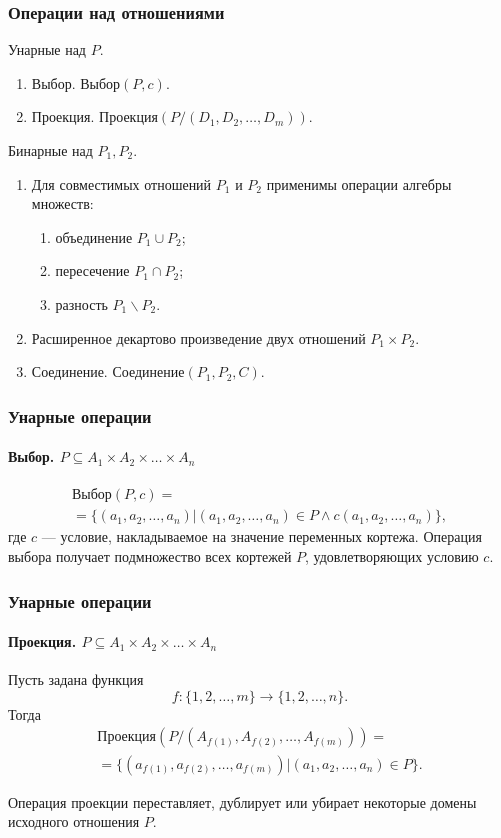 \begin{frame}
    \frametitle{Операции над отношениями}
    
    Унарные над $P$.
    \begin{enumerate}
        \item \alert{Выбор}. $\textit{Выбор}(P,c)$.
        \item \alert{Проекция}. $\textit{Проекция}(P/(D_1,D_2,\ldots,D_m))$.
    \end{enumerate}
    
    Бинарные над $P_1,P_2$.
    \begin{enumerate}
        \item Для \alert{совместимых} отношений $P_1$ и $P_2$ применимы операции алгебры множеств:
        \begin{enumerate}
            \item \alert{объединение} $P_1\cup P_2$;
            \item \alert{пересечение} $P_1\cap P_2$;
            \item \alert{разность} $P_1\backslash P_2$.
        \end{enumerate}
        \item \alert{Расширенное декартово произведение} двух отношений $P_1\times P_2$.
        \item \alert{Соединение}. $\textit{Соединение}(P_1,P_2,C)$.
    \end{enumerate}
\end{frame}

\begin{frame}
    \frametitle{Унарные операции}
    \framesubtitle{Выбор. $P\subseteq A_1\times A_2\times\ldots\times A_n$}
    
    \[
        \begin{split}
            \textit{Выбор}(P,c)=\\
            =\{(a_1,a_2,\ldots,a_n)|(a_1,a_2,\ldots,a_n)\in P \land c(a_1,a_2,\ldots,a_n)\},
        \end{split}
    \]
    где $c$ --- условие, накладываемое на значение переменных кортежа. Операция \alert{выбора} получает подмножество всех кортежей $P$, удовлетворяющих условию $c$.
\end{frame}

\begin{frame}
    \frametitle{Унарные операции}
    \framesubtitle{Проекция. $P\subseteq A_1\times A_2\times\ldots\times A_n$}
    
    Пусть задана функция
    \[ f:\{1,2,\ldots,m\}\to\{1,2,\ldots,n\}. \]
    Тогда
    \[
        \begin{split}
            \textit{Проекция}(P/(A_{f(1)},A_{f(2)},\ldots,A_{f(m)}))=\\
            =\{(a_{f(1)},a_{f(2)},\ldots,a_{f(m)})|(a_1,a_2,\ldots,a_n)\in P\}.
        \end{split}
    \]
    
    Операция \alert{проекции} переставляет, дублирует или убирает некоторые домены исходного отношения $P$.
\end{frame}

